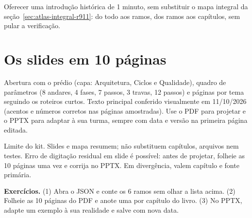 \begin{funcao}
Oferecer uma introdução histórica de 1 minuto, sem substituir o mapa integral da seção~\ref{sec:atlas-integral-r911}: do todo aos ramos, dos ramos aos capítulos, sem pular a verificação.
\end{funcao}

\section{Os slides em 10 páginas}


\begin{descricao}
Abertura com o prédio (capa: Arquitetura, Ciclos e Qualidade), quadro de parâmetros (8 andares, 4 fases, 7 passos, 3 travas, 12 passos) e páginas por tema seguindo os roteiros curtos. Texto principal conferido visualmente em 11/10/2026 (acentos e números corretos nas páginas amostradas). Use o PDF para projetar e o PPTX para adaptar à sua turma, sempre com data e versão na primeira página editada.
\end{descricao}

\begin{aviso}
Limite do kit. Slides e mapa resumem; não substituem capítulos, arquivos nem testes. Erro de digitação residual em slide é possível: antes de projetar, folheie as 10 páginas uma vez e corrija no PPTX. Em divergência, valem capítulo e fonte primária.
\end{aviso}

\begin{resultado}
\textbf{Exercícios.} (1) Abra o JSON e conte os 6 ramos sem olhar a lista acima. (2) Folheie as 10 páginas do PDF e anote uma por capítulo do livro. (3) No PPTX, adapte um exemplo à sua realidade e salve com nova data.
\end{resultado}

